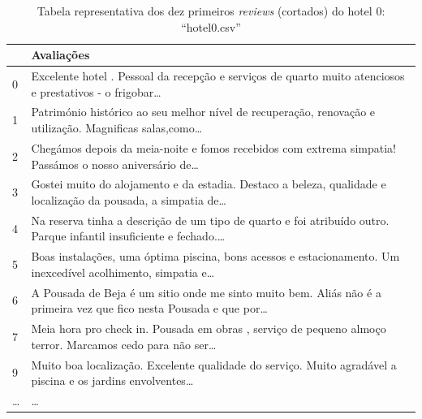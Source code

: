 \documentclass[a4paper,10pt]{article}
\begin{document}
\begin{table}[!ht]
  \centering
  \begin{adjustbox}{width=\columnwidth,center}
    \begin{tabular}{|l|l|}
      \hline
      ~      & Avaliações                                                                                                               \\ \hline
      0      & Excelente hotel .  Pessoal da recepção e serviços de quarto muito atenciosos e prestativos -  o frigobar\ldots           \\ \hline
      1      & Património histórico ao seu melhor nível de recuperação, renovação e utilização. Magnificas salas,como\ldots             \\ \hline
      2      & Chegámos depois da meia-noite e fomos recebidos com extrema simpatia! Passámos o nosso aniversário de\ldots              \\ \hline
      3      & Gostei muito do alojamento e da estadia. Destaco a beleza, qualidade e localização da  pousada, a simpatia de\ldots      \\ \hline
      4      & Na reserva tinha a descrição de um tipo de quarto e foi atribuído outro. Parque infantil insuficiente e fechado.\ldots   \\ \hline
      5      & Boas instalações, uma óptima piscina, bons acessos e estacionamento.  Um inexcedível acolhimento, simpatia e\ldots       \\ \hline
      6      & A Pousada de Beja é um sitio onde me sinto muito bem. Aliás não é a primeira vez que  fico nesta Pousada e que por\ldots \\ \hline
      7      & Meia hora pro check in. Pousada em obras , serviço de pequeno almoço terror. Marcamos cedo para não ser\ldots            \\ \hline
      9      & Muito boa localização. Excelente qualidade do serviço.  Muito agradável a piscina e os jardins envolventes\ldots         \\ \hline
      \ldots & \ldots                                                                                                                   \\ \hline
    \end{tabular}
  \end{adjustbox}
  \caption{Tabela representativa dos dez primeiros \textit{reviews} (cortados) do hotel 0: ``hotel0.csv''}
\end{table}
\end{document}
